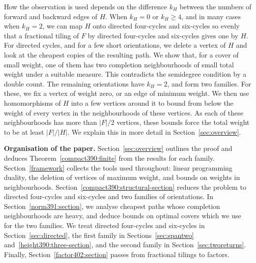 How the observation is used depends on the difference $k_H$ between the numbers of forward and backward edges of $H$.
When $k_H=0$ or $k_H\ge4$, and in many cases when $k_H=2$, we can map $H$ onto directed four-cycles and six-cycles so evenly that a fractional tiling of $F$ by directed four-cycles and six-cycles gives one by $H$. For directed cycles, and for a few short orientations, we delete a vertex of $H$ and look at the cheapest copies of the resulting path. We show that, for a cover of small weight, one of them has two completion neighbourhoods of small total weight under a suitable measure. This contradicts the semidegree condition by a double count.
The remaining orientations have $k_H=2$, and form two families. For these, we fix a vertex of weight zero, or an edge of minimum weight. We then use homomorphisms of $H$ into a few vertices around it to bound from below the weight of every vertex in the neighbourhoods of these vertices. As each of these neighbourhoods has more than $|F|/2$ vertices, these bounds force the total weight to be at least $|F|/|H|$.
We explain this in more detail in Section~\ref{sec:overview}.

\smallskip

\noindent\textbf{Organisation of the paper.}
Section~\ref{sec:overview} outlines the proof and deduces Theorem~\ref{compact390:finite} from the results for each family.
Section~\ref{framework} collects the tools used throughout: linear programming duality, the deletion of vertices of maximum weight, and bounds on weights in neighbourhoods.
Section~\ref{compact390:structural-section} reduces the problem to directed four-cycles and six-cycles and two families of orientations.
In Section~\ref{norm391:section}, we analyse cheapest paths whose completion neighbourhoods are heavy, and deduce bounds on optimal covers which we use for the two families.
We treat directed four-cycles and six-cycles in Section~\ref{sec:directed}, the first family in Sections~\ref{sec:spantwo} and~\ref{height390:three-section}, and the second family in Section~\ref{sec:tworeturns}.
Finally, Section~\ref{factor402:section} passes from fractional tilings to factors.
